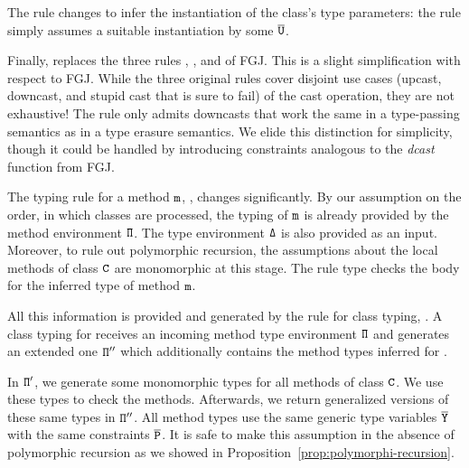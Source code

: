 The rule  changes to infer the
instantiation of the class's type parameters: the rule
simply assumes a suitable instantiation by some $\overline{\tt U}$.

Finally,  replaces the three rules
, , and 
of FGJ. This is a slight simplification with respect to FGJ. While
the three original rules cover disjoint use cases (upcast, downcast,
and stupid cast that is sure to fail) of the cast
operation, they are not exhaustive! The rule  only
admits downcasts that work the same in a type-passing semantics as in
a type erasure semantics. We elide this distinction for simplicity,
though it could be handled by introducing constraints analogous to the
\textit{dcast} function from FGJ. 



The typing rule for a method ${\tt m}$, , changes
significantly. By our assumption on the order, in which classes are
processed, the typing of ${\tt m}$ is already provided by the 
method environment ${\tt \Pi}$.  The type environment ${\tt \Delta}$ is
also provided as an input. Moreover, to rule out polymorphic
recursion, the assumptions about the local methods of class ${\tt C}$
are monomorphic at this stage. The rule type checks the body for the
inferred type of method ${\tt m}$.

All this information is provided and generated by the rule for class
typing, . A class typing for  receives an incoming
method type environment ${\tt \Pi}$ and generates an extended one
${\tt \Pi''}$ which additionally contains the method types inferred for
.

In ${\tt \Pi'}$, we generate some monomorphic types for all
methods of class ${\tt C}$. We use these types to check the methods. Afterwards, we
return generalized versions of these same types in ${\tt \Pi''}$. All
method types use the same generic type variables $\overline{\tt Y}$ with the
same constraints $\overline{\tt P}$. It is safe to make this assumption in the absence of
polymorphic recursion as we showed in
Proposition~\ref{prop:polymorphi-recursion}.


